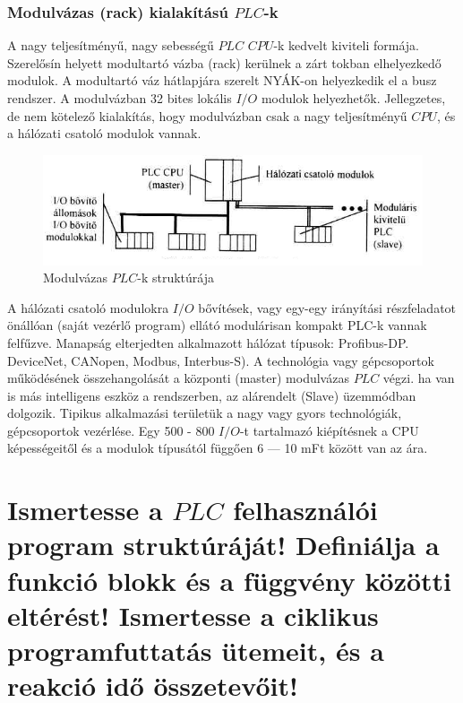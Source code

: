 \documentclass[11pt,a4paper]{article}
\begin{document}
\subsubsection{Modulvázas (rack) kialakítású $PLC$-k}
A nagy teljesítményű, nagy sebességű $PLC$ $CPU$-k kedvelt kiviteli formája. Szerelősín helyett modultartó vázba (rack) kerülnek a zárt tokban elhelyezkedő modulok. A modultartó váz hátlapjára szerelt NYÁK-on helyezkedik el a busz rendszer. A modulvázban 32 bites lokális $I/O$ modulok helyezhetők. Jellegzetes, de nem kötelező kialakítás, hogy modulvázban csak a nagy teljesítményű $CPU$, és a hálózati csatoló modulok vannak.
\begin{figure}[hbtp]
    	 \centering
		\includegraphics[scale=0.7]{4_rack_plc.png}
		\caption{Modulvázas $PLC$-k struktúrája}
\end{figure}
A hálózati csatoló modulokra $I/O$ bővítések, vagy egy-egy irányítási részfeladatot önállóan (saját vezérlő program) ellátó modulárisan kompakt PLC-k vannak felfűzve. Manapság elterjedten alkalmazott hálózat típusok: Profibus-DP. DeviceNet, CANopen, Modbus, Interbus-S).
A technológia vagy gépcsoportok működésének összehangolását a központi (master) modulvázas $PLC$ végzi. ha van is más intelligens eszköz a rendszerben, az alárendelt (Slave) üzemmódban dolgozik.
Tipikus alkalmazási területük a nagy vagy gyors technológiák, gépcsoportok vezérlése. Egy 500 - 800 $I/O$-t tartalmazó kiépítésnek a CPU képességeitől és a modulok típusától függően 6 — 10 mFt között van az ára.

\section{Ismertesse a $PLC$ felhasználói program struktúráját! Definiálja a funkció blokk és a függvény közötti eltérést! Ismertesse a ciklikus programfuttatás ütemeit, és a reakció idő összetevőit! }
\end{document}
